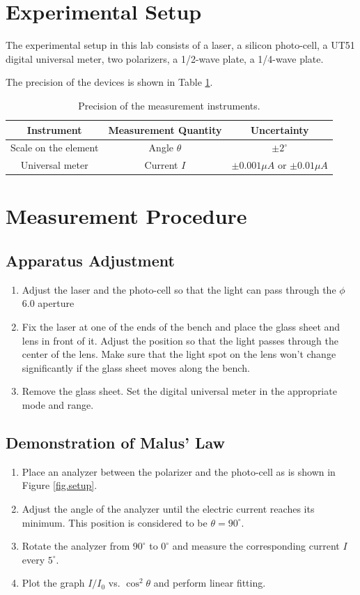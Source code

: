 \documentclass{article}
\begin{document}
\section{Experimental Setup}

The experimental setup in this lab consists of a laser, a silicon photo-cell, a UT51 digital universal meter, two polarizers, a 1/2-wave plate, a 1/4-wave plate. 

The precision of the devices is shown in Table \ref{tablePresicion}.

\begin{table}[H]
\centering
\begin{tabular}{ccc}
\toprule
Instrument & Measurement Quantity & Uncertainty\\
\midrule
Scale on the element & Angle $\theta$ & $\pm2^\circ$\\
 Universal meter & Current $I$ & $\pm0.001\mu A$ or $\pm0.01\mu A$\\
\bottomrule
\end{tabular}
\caption{Precision of the measurement instruments.}\label{tablePresicion}
\end{table}

\section{Measurement Procedure}

\subsection{Apparatus Adjustment}
\begin{enumerate}
\item Adjust the laser and the photo-cell so that the light can pass through the $\phi$ 6.0 aperture
\item Fix the laser at one of the ends of the bench and place the glass sheet and lens in front of it. Adjust the position so that the light passes through the center of the lens. Make sure that the light spot on the lens won't change significantly if the glass sheet moves along the bench.
\item Remove the glass sheet. Set the digital universal meter in the appropriate mode and range.
\end{enumerate}

\subsection{Demonstration of Malus' Law}
\begin{enumerate}
\item Place an analyzer between the polarizer and the photo-cell as is shown in Figure \ref{fig.setup}.
\item Adjust the angle of the analyzer until the electric current reaches its minimum. This position is considered to be $\theta = 90^\circ$.
\item Rotate the analyzer from $90^\circ$ to $0^\circ$ and measure the corresponding current $I$ every $5^\circ$.
\item Plot the graph $I/I_0$ vs. $\cos^2\theta$ and perform linear fitting.
\end{enumerate}
\end{document}
